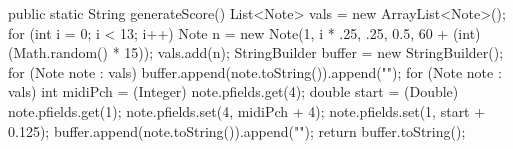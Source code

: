 public static String generateScore() {
        List<Note> vals = new ArrayList<Note>();
        for (int i = 0; i < 13; i++) {
            Note n = new Note(1, i * .25, .25, 0.5,
                    60 + (int) (Math.random() * 15));
            vals.add(n);
        }
        StringBuilder buffer = new StringBuilder();
        for (Note note : vals) {
            buffer.append(note.toString()).append("\n");
        }
        for (Note note : vals) {
            int midiPch = (Integer) note.pfields.get(4);
            double start = (Double) note.pfields.get(1);
            note.pfields.set(4, midiPch + 4);
            note.pfields.set(1, start + 0.125);
            buffer.append(note.toString()).append("\n");
        }
        return buffer.toString();
    }
